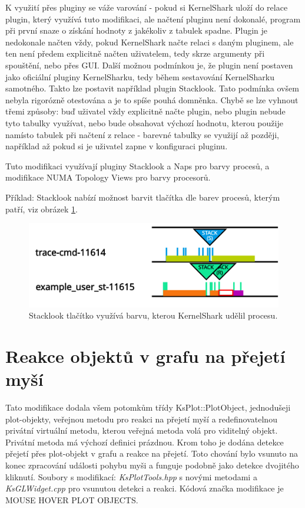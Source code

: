 K využití přes pluginy se váže varování - pokud si KernelShark uloží do relace plugin, který využívá tuto modifikaci, ale načtení pluginu není dokonalé, program při první snaze o získání hodnoty z jakékoliv z tabulek spadne. Plugin je nedokonale načten vždy, pokud KernelShark načte relaci s daným pluginem, ale ten není předem explicitně načten uživatelem, tedy skrze argumenty při spouštění, nebo přes GUI. Další možnou podmínkou je, že plugin není postaven jako oficiální pluginy KernelSharku, tedy během sestavování KernelSharku samotného. Takto lze postavit například plugin Stacklook. Tato podmínka ovšem nebyla rigorózně otestována a je to spíše pouhá domněnka. Chybě se lze vyhnout třemi způsoby: buď uživatel vždy explicitně načte plugin, nebo plugin nebude tyto tabulky využívat, nebo bude obsahovat výchozí hodnotu, kterou použije namísto tabulek při načtení z relace - barevné tabulky se využijí až později, například až pokud si je uživatel zapne v konfiguraci pluginu.

Tuto modifikaci využívají pluginy Stacklook a Naps pro barvy procesů, a modifikace NUMA Topology Views pro barvy procesorů.

Příklad: Stacklook nabízí možnost barvit tlačítka dle barev procesů, kterým patří, viz obrázek \ref{obr01:modif-get-colors}.

\begin{figure}[p]\centering
    \includegraphics[width=140mm]{img/Modifikace/modif-get-colors-traced.png}
    \caption{Stacklook tlačítko využívá barvu, kterou KernelShark udělil procesu.}
    \label{obr01:modif-get-colors}
\end{figure}

\section{Reakce objektů v grafu na přejetí myší}

Tato modifikace dodala všem potomkům třídy KsPlot::PlotObject, jednodušeji plot-objekty, veřejnou metodu pro reakci na přejetí myší a redefinovatelnou privátní virtuální metodu, kterou veřejná metoda volá pro viditelný objekt. Privátní metoda má výchozí definici prázdnou. Krom toho je dodána detekce přejetí přes plot-objekt v grafu a reakce na přejetí. Toto chování bylo vsunuto na konec zpracování události pohybu myši a funguje podobně jako detekce dvojitého kliknutí. Soubory s modifikací: \emph{KsPlotTools.hpp} s novými metodami a \emph{KsGLWidget.cpp} pro vsunutou detekci a reakci. Kódová značka modifikace je MOUSE HOVER PLOT OBJECTS.

